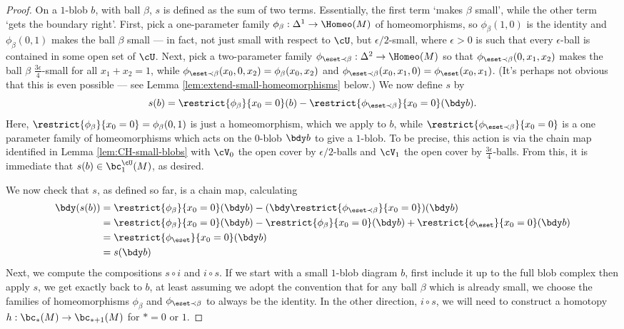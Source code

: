 \begin{proof}
On a $1$-blob $b$, with ball $\beta$, $s$ is defined as the sum of two terms. Essentially, the first term `makes $\beta$ small', while the other term `gets the boundary right'. First, pick a one-parameter family $\phi_\beta : \Delta^1 \to \Homeo(M)$ of homeomorphisms, so $\phi_\beta(1,0)$ is the identity and $\phi_\beta(0,1)$ makes the ball $\beta$ small --- in fact, not just small with respect to $\cU$, but $\epsilon/2$-small, where $\epsilon > 0$ is such that every $\epsilon$-ball is contained in some open set of $\cU$. Next, pick a two-parameter family $\phi_{\eset \prec \beta} : \Delta^2 \to \Homeo(M)$ so that $\phi_{\eset \prec \beta}(0,x_1,x_2)$ makes the ball $\beta$ $\frac{3\epsilon}{4}$-small for all $x_1+x_2=1$, while $\phi_{\eset \prec \beta}(x_0,0,x_2) = \phi_\beta(x_0,x_2)$ and $\phi_{\eset \prec \beta}(x_0,x_1,0) = \phi_\eset(x_0,x_1)$. (It's perhaps not obvious that this is even possible --- see Lemma \ref{lem:extend-small-homeomorphisms} below.) We now define $s$ by
$$s(b) = \restrict{\phi_\beta}{x_0=0}(b) - \restrict{\phi_{\eset \prec \beta}}{x_0=0}(\bdy b).$$
Here, $\restrict{\phi_\beta}{x_0=0} = \phi_\beta(0,1)$ is just a homeomorphism, which we apply to $b$, while $\restrict{\phi_{\eset \prec \beta}}{x_0=0}$ is a one parameter family of homeomorphisms which acts on the $0$-blob $\bdy b$ to give a $1$-blob. To be precise, this action is via the chain map identified in Lemma \ref{lem:CH-small-blobs} with $\cV_0$ the open cover by $\epsilon/2$-balls and $\cV_1$ the open cover by $\frac{3\epsilon}{4}$-balls. From this, it is immediate that $s(b) \in \bc^{\cU}_1(M)$, as desired.

We now check that $s$, as defined so far, is a chain map, calculating
\begin{align*}
\bdy (s(b)) & = \restrict{\phi_\beta}{x_0=0}(\bdy b) - (\bdy \restrict{\phi_{\eset \prec \beta}}{x_0=0})(\bdy b) \\
		 & = \restrict{\phi_\beta}{x_0=0}(\bdy b) - \restrict{\phi_\beta}{x_0=0}(\bdy b) + \restrict{\phi_\eset}{x_0=0}(\bdy b) \\
		 & = \restrict{\phi_\eset}{x_0=0}(\bdy b) \\
		 & = s(\bdy b)
\end{align*}
Next, we compute the compositions $s \circ i$ and $i \circ s$. If we start with a small $1$-blob diagram $b$, first include it up to the full blob complex then apply $s$, we get exactly back to $b$, at least assuming we adopt the convention that for any ball $\beta$ which is already small, we choose the families of homeomorphisms $\phi_\beta$ and $\phi_{\eset \prec \beta}$ to always be the identity. In the other direction, $i \circ s$, we will need to construct a homotopy $h:\bc_*(M) \to \bc_{*+1}(M)$ for $*=0$ or $1$.


\end{proof}
